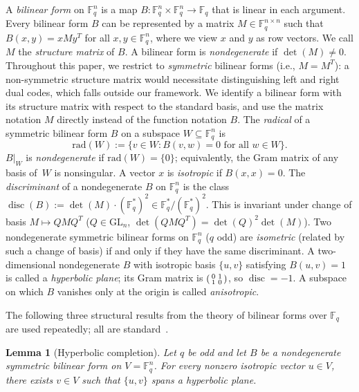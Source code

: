 \documentclass[11pt]{article}
\newcommand{\FF}{\mathbb{F}}
\newcommand{\0}{\mathbf{0}}
\newcommand{\1}{\mathbf{1}}
\DeclareMathOperator{\disc}{disc}
\theoremstyle{plain}
\newtheorem{lemma}[theorem]{Lemma}
\theoremstyle{definition}
\theoremstyle{remark}
\begin{document}
A \emph{bilinear form} on $\FF_q^n$ is a map $B: \FF_q^n \times \FF_q^n \rightarrow \FF_q$ that is linear in each argument. Every bilinear form $B$ can be represented by a matrix $M \in \FF_q^{n \times n}$ such that $B(x, y) = xMy^T$ for all $x, y \in \FF_q^n$, where we view $x$ and $y$ as row vectors. We call $M$ the \emph{structure matrix} of $B$. A bilinear form is \emph{nondegenerate} if $\det(M) \neq 0$. Throughout this paper, we restrict to \emph{symmetric} bilinear forms (i.e., $M = M^T$): a non-symmetric structure matrix would necessitate distinguishing left and right dual codes, which falls outside our framework. We identify a bilinear form with its structure matrix with respect to the standard basis, and use the matrix notation $M$ directly instead of the function notation $B$.
The \emph{radical} of a symmetric bilinear form $B$ on a subspace $W \subseteq \FF_q^n$ is
\[
\mathrm{rad}(W) := \{v \in W : B(v, w) = 0 \text{ for all } w \in W\}.
\]
$B|_W$ is \emph{nondegenerate} if $\mathrm{rad}(W) = \{0\}$; equivalently, the Gram matrix of any basis of~$W$ is nonsingular. A vector $x$ is \emph{isotropic} if  $B(x,x) = 0$.
The \emph{discriminant} of a nondegenerate $B$ on $\FF_q^n$ is the class $\disc(B) := \det(M) \cdot (\FF_q^*)^2 \in \FF_q^*/(\FF_q^*)^2$. This is invariant under change of basis $M \mapsto QMQ^T$ ($Q \in \mathrm{GL}_n$, $\det(QMQ^T) = \det(Q)^2 \det(M)$). Two nondegenerate symmetric bilinear forms on $\FF_q^n$ ($q$ odd) are \emph{isometric} (related by such a change of basis) if and only if they have the same discriminant.
A two-dimensional nondegenerate $B$ with isotropic basis $\{u, v\}$ satisfying $B(u,v) = 1$ is called a \emph{hyperbolic plane}; its Gram matrix is $\begin{psmallmatrix} 0 & 1 \\ 1 & 0 \end{psmallmatrix}$, so $\disc = -1$. A subspace on which $B$ vanishes only at the origin is called \emph{anisotropic}.

The following three structural results from the theory of bilinear forms over $\FF_q$ are used repeatedly; all are standard~\cite{taylor1992geometry}.

\begin{lemma}[Hyperbolic completion]\label{lem:hyperbolic_completion}
Let $q$ be odd and let $B$ be a nondegenerate symmetric bilinear form on $V = \FF_q^n$. For every nonzero isotropic vector $u \in V$, there exists $v \in V$ such that $\{u, v\}$ spans a hyperbolic plane.
\end{lemma}
\end{document}
